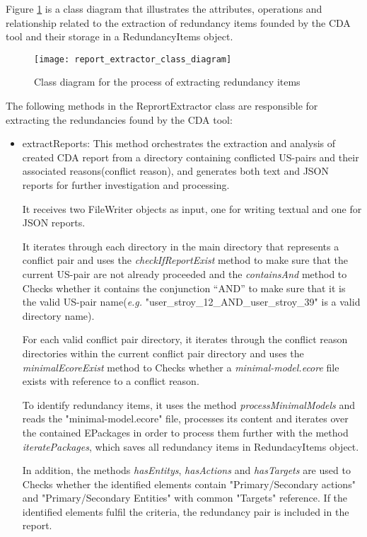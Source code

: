 Figure \ref{fig:report_extractor_class_diagram} is a class diagram that illustrates the attributes, operations and relationship related to the extraction of redundancy items founded by the CDA tool and their storage in a RedundancyItems object.
\begin{figure}[h]
	\centering
	\texttt{[image: report\_extractor\_class\_diagram]}
	\caption{Class diagram for the process of extracting redundancy items}\label{fig:report_extractor_class_diagram}
\end{figure} 

The following methods in the ReprortExtractor class are responsible for extracting the redundancies found by the CDA tool:
\begin{itemize}
	\item extractReports: This method orchestrates the extraction and analysis of created CDA report from a directory containing conflicted US-pairs and their associated reasons(conflict reason), and generates both text and JSON reports for further investigation and processing.
	
	It receives two FileWriter objects as input, one for writing textual and one for JSON reports.
	
	It iterates through each directory in the main directory that represents a conflict pair and uses the \textit{checkIfReportExist} method to make sure that the current US-pair are not already proceeded and the \textit{containsAnd} method to Checks whether it contains the conjunction \enquote{AND} to make sure that it is the valid US-pair name(\textit{e.g.} "user\_stroy\_12\_AND\_user\_stroy\_39" is a valid directory name).
	
	For each valid conflict pair directory, it iterates through the conflict reason directories within the current conflict pair directory and uses the \textit{minimalEcoreExist} method to Checks whether a \textit{minimal-model.ecore} file exists with reference to a conflict reason.
	
	To identify redundancy items, it uses the method \textit{processMinimalModels} and reads the "minimal-model.ecore" file, processes its content and iterates over the contained EPackages in order to process them further with the method \textit{iteratePackages}, which saves all redundancy items in RedundacyItems object.
	
	In addition, the methods \textit{hasEntitys}, \textit{hasActions} and \textit{hasTargets} are used to Checks whether the identified elements contain "Primary/Secondary actions" and "Primary/Secondary Entities" with common "Targets" reference. If the identified elements fulfil the criteria, the redundancy pair is included in the report.
	

\end{itemize}
